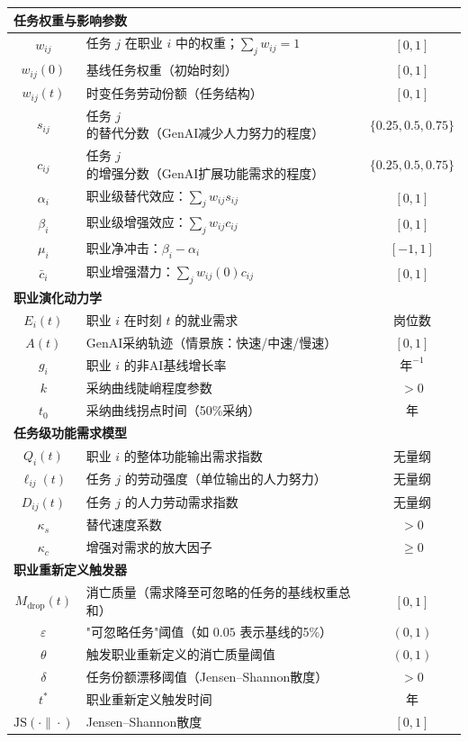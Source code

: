 \begin{longtable}{clc}
\multicolumn{3}{l}{\textbf{任务权重与影响参数}} \\
\midrule
$w_{ij}$ & 任务 $j$ 在职业 $i$ 中的权重；$\sum_j w_{ij}=1$ & $[0,1]$ \\
$w_{ij}(0)$ & 基线任务权重（初始时刻） & $[0,1]$ \\
$w_{ij}(t)$ & 时变任务劳动份额（任务结构） & $[0,1]$ \\
$s_{ij}$ & 任务 $j$ 的替代分数（GenAI减少人力努力的程度） & $\{0.25,0.5,0.75\}$ \\
$c_{ij}$ & 任务 $j$ 的增强分数（GenAI扩展功能需求的程度） & $\{0.25,0.5,0.75\}$ \\
$\alpha_i$ & 职业级替代效应：$\sum_j w_{ij}s_{ij}$ & $[0,1]$ \\
$\beta_i$ & 职业级增强效应：$\sum_j w_{ij}c_{ij}$ & $[0,1]$ \\
$\mu_i$ & 职业净冲击：$\beta_i-\alpha_i$ & $[-1,1]$ \\
$\bar c_i$ & 职业增强潜力：$\sum_j w_{ij}(0) c_{ij}$ & $[0,1]$ \\
\midrule

\multicolumn{3}{l}{\textbf{职业演化动力学}} \\
\midrule
$E_i(t)$ & 职业 $i$ 在时刻 $t$ 的就业需求 & 岗位数 \\
$A(t)$ & GenAI采纳轨迹（情景族：快速/中速/慢速） & $[0,1]$ \\
$g_i$ & 职业 $i$ 的非AI基线增长率 & $\text{年}^{-1}$ \\
$k$ & 采纳曲线陡峭程度参数 & $>0$ \\
$t_0$ & 采纳曲线拐点时间（50\%采纳） & 年 \\
\midrule

\multicolumn{3}{l}{\textbf{任务级功能需求模型}} \\
\midrule
$Q_i(t)$ & 职业 $i$ 的整体功能输出需求指数 & 无量纲 \\
$\ell_{ij}(t)$ & 任务 $j$ 的劳动强度（单位输出的人力努力） & 无量纲 \\
$D_{ij}(t)$ & 任务 $j$ 的人力劳动需求指数 & 无量纲 \\
$\kappa_s$ & 替代速度系数 & $>0$ \\
$\kappa_c$ & 增强对需求的放大因子 & $\ge 0$ \\
\midrule

\multicolumn{3}{l}{\textbf{职业重新定义触发器}} \\
\midrule
$M_{\text{drop}}(t)$ & 消亡质量（需求降至可忽略的任务的基线权重总和） & $[0,1]$ \\
$\varepsilon$ & "可忽略任务"阈值（如 $0.05$ 表示基线的5\%） & $(0,1)$ \\
$\theta$ & 触发职业重新定义的消亡质量阈值 & $(0,1)$ \\
$\delta$ & 任务份额漂移阈值（Jensen--Shannon散度） & $>0$ \\
$t^*$ & 职业重新定义触发时间 & 年 \\
$\mathrm{JS}(\cdot\|\cdot)$ & Jensen--Shannon散度 & $[0,1]$ \\
\midrule


\end{longtable}
